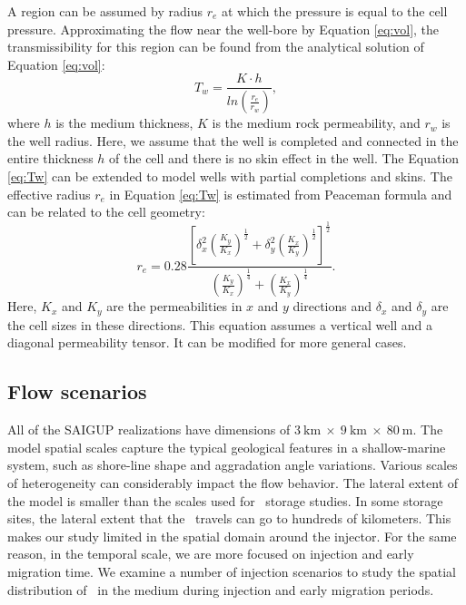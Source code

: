 A region can be assumed by radius $r_e$ at which the
pressure is equal to the cell pressure. Approximating the flow near the
well-bore by Equation \ref{eq:vol}, the transmissibility for this region can be
found from the analytical solution of Equation \ref{eq:vol}:
\begin{equation}
 T_w=\frac{K \cdot h}{ln(\frac{r_e}{r_w})},
 \label{eq:Tw}
\end{equation} where $h$ is the medium
thickness, $K$ is the medium rock permeability, and $r_{w}$ is the well radius. Here, we assume that the well is completed and connected in the entire thickness $h$ of the cell and there is no skin effect in the well. The Equation \ref{eq:Tw} can be extended to model wells with partial completions and skins. The effective radius $r_{e}$ in Equation \ref{eq:Tw} is estimated from Peaceman formula and can be related to the cell geometry:
\begin{equation}
r_e =  0.28\frac{\left[
\delta_x^2(\frac{K_y}{K_x})^{\frac{1}{2}}+\delta_y^2(\frac{K_x}{K_y})^{\frac{1}{
2}}\right]^{\frac{1}{2}}}{(\frac{K_y}{K_x})^{\frac{1}{4}}+(\frac{K_x}{K_y})^{
\frac{1}{4}}}.
\label{eq:rinf} 
\end{equation} Here, $K_x$ and $K_y$ are the permeabilities in $x$ and $y$
directions and $\delta_x$ and $\delta_y$ are the cell sizes in these directions.
This equation assumes a vertical well and a diagonal permeability tensor. It can
be modified for more general cases.

\subsection{Flow scenarios}
\label{sec:flowScenarios}

All of the SAIGUP realizations have dimensions of $3~\mbox{km}~\times~9~\mbox{km}~\times~80~\mbox{m}$. The model spatial scales capture the typical geological features in a shallow-marine system, such as shore-line shape and aggradation angle variations. Various scales of heterogeneity can considerably impact the flow behavior. The lateral extent of the model is smaller than the scales used for \coo\ storage studies. In some storage sites, the lateral extent that the \coo\ travels can go to hundreds of kilometers. This makes our study limited in the spatial domain around the injector. For the same reason, in the temporal scale, we are more focused on injection and early migration time. We examine a number of injection scenarios to study the spatial distribution of \coo\ in the medium during injection and early migration periods.

